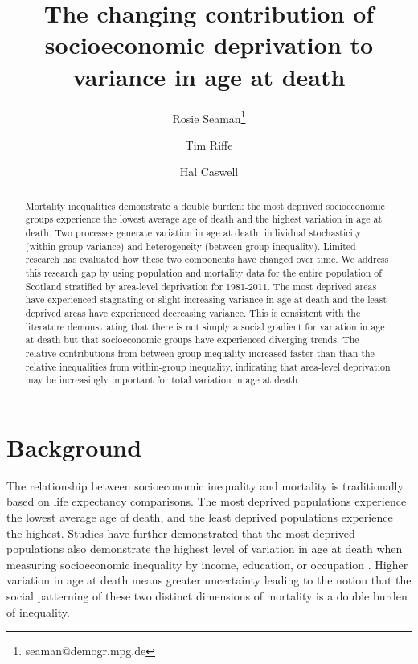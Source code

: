 \documentclass[12pt,oneside,a4paper]{article} %
\theoremstyle{definition}
\begin{document}
\title{The changing contribution of socioeconomic deprivation to variance in age at death}
\author[1]{Rosie Seaman\thanks{seaman@demogr.mpg.de}}
\author[1]{Tim Riffe}
\author[2]{Hal Caswell}


\maketitle

\begin{abstract}
Mortality inequalities demonstrate a double burden: the most deprived socioeconomic
groups experience the lowest average age of death and the highest variation in
age at death. Two processes generate variation in age at death: individual
stochasticity (within-group variance) and heterogeneity (between-group
inequality). Limited research has evaluated how these two components have
changed over time. We address this research gap by using population and
mortality data for the entire population of Scotland stratified by area-level deprivation for 1981-2011. The most deprived areas have experienced stagnating or slight increasing variance in
age at death and the least deprived areas have experienced decreasing variance.
This is consistent with the literature demonstrating that there is not
simply a social gradient for variation in age at death but that socioeconomic groups have experienced diverging trends. The relative contributions from between-group inequality increased faster than than the relative inequalities from within-group inequality, indicating that area-level deprivation may be increasingly important for total variation in age at death.
\end{abstract}

\section{Background}
The relationship between socioeconomic inequality and mortality is traditionally
based on life expectancy comparisons. The most deprived populations
experience the lowest average age of death, and the least deprived populations
experience the highest. Studies have further demonstrated that the most deprived
populations also demonstrate the highest level of variation in age at death when
measuring socioeconomic inequality by income, education, or occupation
\citep{Broennum-Hansen2017,Raalte2011,Sasson2016,Raalte2014}. Higher variation in age at death means greater uncertainty leading to the notion that the social patterning of these two distinct dimensions of mortality is a double burden of inequality. 
\end{document}

